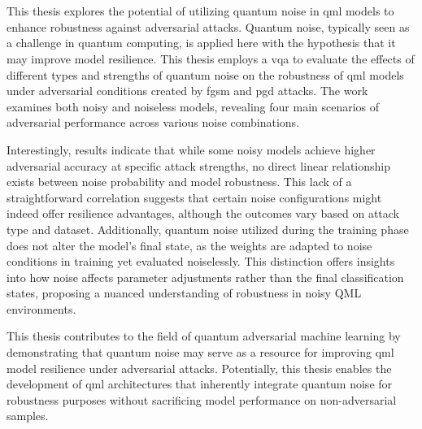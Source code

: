 \chapter{\abstractname}

This thesis explores the potential of utilizing quantum noise in \acl{qml}
models to enhance robustness against adversarial attacks. Quantum noise,
typically seen as a challenge in quantum computing, is applied here with
the hypothesis that it may improve model resilience. This thesis employs a
\acl{vqa} to evaluate the effects of different types and strengths of
quantum noise on the robustness of \ac{qml} models under adversarial
conditions created by \acl{fgsm} and \acl{pgd} attacks. The work examines
both noisy and noiseless models, revealing four main scenarios of
adversarial performance across various noise combinations. \

Interestingly, results indicate that while some noisy models achieve
higher adversarial accuracy at specific attack strengths, no
direct linear relationship exists between noise probability and
model robustness. This lack of a straightforward correlation suggests
that certain noise configurations might indeed offer resilience advantages,
although the outcomes vary based on attack type and dataset. Additionally,
quantum noise utilized during the training phase does not alter the model's
final state, as the weights are adapted to noise conditions in
training yet evaluated noiselessly. This distinction offers
insights into how noise affects parameter adjustments rather
than the final classification states, proposing a nuanced
understanding of robustness in noisy QML environments. \

This thesis contributes to the field of quantum adversarial machine
learning by demonstrating that quantum noise may serve as a resource
for improving \acl{qml} model resilience under adversarial attacks. 
Potentially, this thesis enables the development of \ac{qml}
architectures that inherently integrate quantum noise for
robustness purposes without sacrificing model performance on
non-adversarial samples. \
